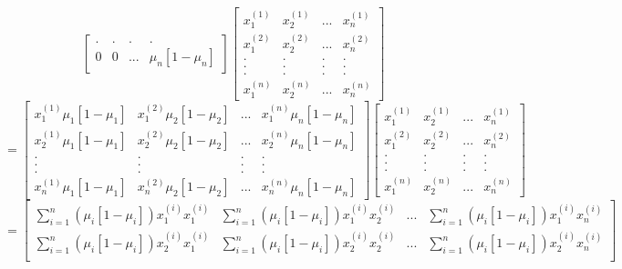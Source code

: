 \documentclass[12pt,letterpaper]{hmcpset}
\begin{document}
\begin{solution}
\begin{enumerate}[(a)]
$$\begin{bmatrix}
        .      &   .    &  .  &  .   \\[5pt]
        0 & 0 & ... & \mu_n[1-\mu_n]
        \end{bmatrix}
        \begin{bmatrix}
        x_1^{(1)} & x_2^{(1)} & ... & x_n^{(1)}  \\%
        x_1^{(2)} & x_2^{(2)} & ... & x_n^{(2)} \\%
        .      &   .    &  .  &  .      \\[-10pt]
        .      &   .    &  .  &  .   \\[-10pt]
        .      &   .    &  .  &  .   \\[5pt]
        x_1^{(n)} & x_2^{(n)} & ... & x_n^{(n)}
        \end{bmatrix}
	    $$
	    $$
	    = \begin{bmatrix}
        x_1^{(1)}\mu_1[1-\mu_1] & x_1^{(2)}\mu_2[1-\mu_2] & ... & x_1^{(n)}\mu_n[1-\mu_n]  \\%
        x_2^{(1)}\mu_1[1-\mu_1] & x_2^{(2)}\mu_2[1-\mu_2] & ... & x_2^{(n)}\mu_n[1-\mu_n] \\%
        .      &   .    &  .  &  .      \\[-10pt]
        .      &   .    &  .  &  .   \\[-10pt]
        .      &   .    &  .  &  .   \\[5pt]
        x_n^{(1)}\mu_1[1-\mu_1] & x_n^{(2)}\mu_2[1-\mu_2] & ... & x_n^{(n)}\mu_n[1-\mu_n]
        \end{bmatrix}
        \begin{bmatrix}
        x_1^{(1)} & x_2^{(1)} & ... & x_n^{(1)}  \\%
        x_1^{(2)} & x_2^{(2)} & ... & x_n^{(2)} \\%
        .      &   .    &  .  &  .      \\[-10pt]
        .      &   .    &  .  &  .   \\[-10pt]
        .      &   .    &  .  &  .   \\[5pt]
        x_1^{(n)} & x_2^{(n)} & ... & x_n^{(n)}
        \end{bmatrix}
	    $$
	    $$
	    = \begin{bmatrix}
        \sum_{i=1}^n (\mu_i[1-\mu_i])x_1^{(i)}x_1^{(i)} & \sum_{i=1}^n (\mu_i[1-\mu_i])x_1^{(i)}x_2^{(i)} & ... & \sum_{i=1}^n (\mu_i[1-\mu_i])x_1^{(i)}x_n^{(i)}  \\%
        \sum_{i=1}^n (\mu_i[1-\mu_i])x_2^{(i)}x_1^{(i)} & \sum_{i=1}^n (\mu_i[1-\mu_i])x_2^{(i)}x_2^{(i)} & ... & \sum_{i=1}^n (\mu_i[1-\mu_i])x_2^{(i)}x_n^{(i)} \\%

\end{bmatrix}$$
\end{enumerate}
\end{solution}
\end{document}
